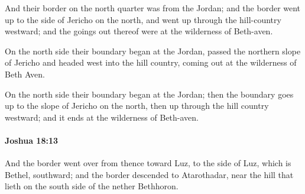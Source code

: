 			\begin{versebox}
					\item[BHS] 
					\item[ASV] And their border on the north quarter was from the Jordan; and the border went up to the side of Jericho on the north, and went up through the hill-country westward; and the goings out thereof were at the wilderness of Beth-aven.
					\item[NIV] On the north side their boundary began at the Jordan, passed the northern slope of Jericho and headed west into the hill country, coming out at the wilderness of Beth Aven.
					\item[NRSV] On the north side their boundary began at the Jordan; then the boundary goes up to the slope of Jericho on the north, then up through the hill country westward; and it ends at the wilderness of Beth-aven.
			\end{versebox}

		\paragraph{Joshua 18:13} %
			\label{JOSHUA-18-13}

			And the border went over from thence toward Luz, to the side of Luz, which is Bethel, southward; and the border descended to Atarothadar, near the hill that lieth on the south side of the nether Bethhoron.

